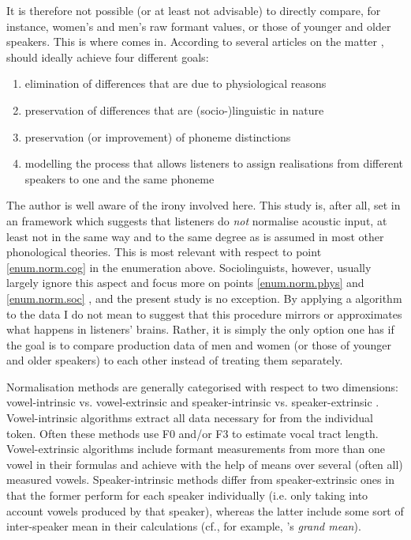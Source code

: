 It is therefore not possible (or at least not advisable) to directly compare, for instance, women's and men's raw formant values, or those of younger and older speakers.
This is where  comes in.
According to several articles on the matter \parencite[cf., for example,][]{fabriciusetal2009,clopper2009,disner1980,kendallthomas2014,thomas2002},  should ideally achieve four different goals:
\begin{enumerate}
	\item \label{enum.norm.phys}elimination of differences that are due to physiological reasons
	\item \label{enum.norm.soc}preservation of differences that are (socio-)linguistic in nature
	\item \label{enum.norm.phon}preservation (or improvement) of phoneme distinctions
	\item \label{enum.norm.cog}modelling the process that allows listeners to assign realisations from different speakers to one and the same phoneme
\end{enumerate}
The author is well aware of the irony involved here.
This study is, after all, set in an  framework which suggests that listeners do \emph{not} normalise acoustic input, at least not in the same way and to the same degree as is assumed in most other phonological theories.
This is most relevant with respect to point \ref{enum.norm.cog} in the enumeration above. Sociolinguists, however, usually largely ignore this aspect and focus more on points \ref{enum.norm.phys} and \ref{enum.norm.soc} \parencites(cf.)()[1430]{clopper2009}[414--415]{fabriciusetal2009}{kendallthomas2014}, and the present study is no exception.
By applying a  algorithm to the data I do not mean to suggest that this procedure mirrors or approximates what happens in listeners' brains.
Rather, it is simply the only option one has if the goal is to compare production data of men and women (or those of younger and older speakers) to each other instead of treating them separately.

Normalisation methods are generally categorised with respect to two dimensions: vowel-intrinsic vs. vowel-extrinsic and speaker-intrinsic vs. speaker-extrinsic \parencite[cf.][]{kendallthomas2014}.
Vowel-intrinsic algorithms extract all data necessary for  from the individual token.
Often these methods use F0 and/or F3 to estimate vocal tract length.
Vowel-extrinsic algorithms include formant measurements from more than one vowel in their formulas and achieve  with the help of means over several (often all) measured vowels.
Speaker-intrinsic methods differ from speaker-extrinsic ones in that the former perform  for each speaker individually (i.e. only taking into account vowels produced by that speaker), whereas the latter include some sort of inter-speaker mean in their calculations (cf., for example, \textcite{labovetal2006}'s \emph{grand mean}).

